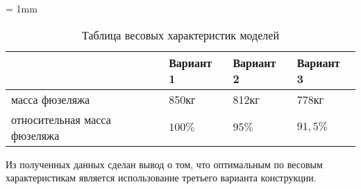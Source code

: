 \tabulinesep = 1mm
\begin{table}[H]
\captionsetup{justification=centering}
\caption{Таблица весовых характеристик моделей}
\begin{tabu}to 
\hline
{}
 & Вариант 1 & Вариант 2 & Вариант 3 \\ \hline
масса фюзеляжа & 850кг & 812кг  & 778кг \\ \hline
относительная масса фюзеляжа & $100\%$ & $95\%$ & $91,5\%$ \\ \hline
\end{tabu}
\label{tab:variantsMasses}
\end{table}

Из полученных данных сделан вывод о том, что оптимальным по весовым характеристикам является использование третьего варианта конструкции. 

